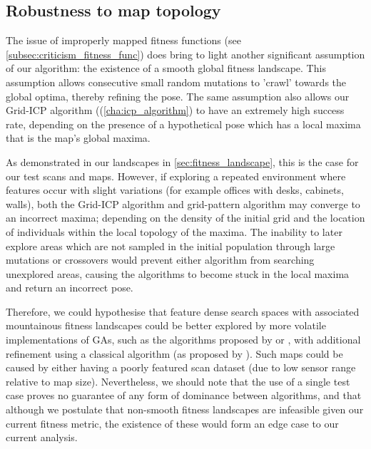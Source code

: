 \documentclass[authoryearcitations]{UoYCSproject}
\begin{document}
\subsection{Robustness to map topology}
\label{subsec:robustness_to_map_topology}

The issue of improperly mapped fitness functions (see \autoref{subsec:criticism_fitness_func}) does bring to light another significant assumption of our algorithm: the existence of a smooth global fitness landscape. This assumption allows consecutive small random mutations to 'crawl' towards the global optima, thereby refining the pose. The same assumption also allows our Grid-ICP algorithm ((\autoref{cha:icp_algorithm}) to have an extremely high success rate, depending on the presence of a hypothetical pose which has a local maxima that is the map's global maxima. \newline

As demonstrated in our landscapes in \autoref{sec:fitness_landscape}, this is the case for our test scans and maps. However, if exploring a repeated environment where features occur with slight variations (for example offices with desks, cabinets, walls), both the Grid-ICP algorithm and grid-pattern algorithm may converge to an incorrect maxima; depending on the density of the initial grid and the location of individuals within the local topology of the maxima. The inability to later explore areas which are not sampled in the initial population through large mutations or crossovers would prevent either algorithm from searching unexplored areas, causing the algorithms to become stuck in the local maxima and return an incorrect pose.\newline

Therefore, we could hypothesise that feature dense search spaces with associated mountainous fitness landscapes could be better explored by more volatile implementations of GAs, such as the algorithms proposed by \citet{Robertson2002-ou} or \citet{Lenac2007-xm}, with additional refinement using a classical algorithm (as proposed by \citet{Lenac2011-co}). Such maps could be caused by either having a poorly featured scan dataset (due to low sensor range relative to map size). Nevertheless, we should note that the use of a single test case proves no guarantee of any form of dominance between algorithms, and that although we postulate that non-smooth fitness landscapes are infeasible given our current fitness metric, the existence of these would form an edge case to our current analysis.
\end{document}
